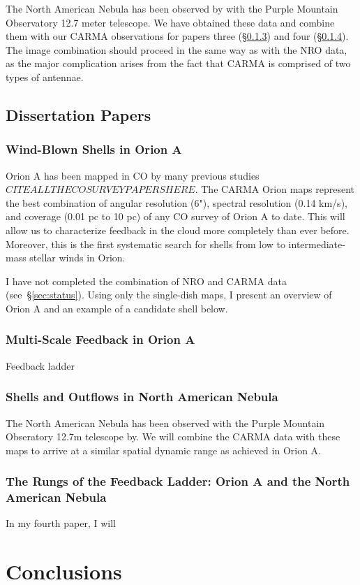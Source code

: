 The North American Nebula has been observed by \citet{Zhang14} with the Purple Mountain Observatory 12.7 meter telescope. We have obtained these data and combine them with our CARMA observations for papers three (\S\ref{sec:paper3}) and four (\S\ref{sec:paper4}). The image combination should proceed in the same way as with the NRO data, as the major complication arises from the fact that CARMA is comprised of two types of antennae.

    
    
    \subsection{Dissertation Papers}\label{sec:papers}
        \subsubsection{Wind-Blown Shells in Orion A}\label{sec:paper1}
Orion A has been mapped in CO by many previous studies$CITE ALL THE CO SURVEY PAPERS HERE$. The CARMA Orion maps represent the best combination of angular resolution (6"), spectral resolution (0.14 km/s), and coverage (0.01 pc to 10 pc) of any CO survey of Orion A to date. This will allow us to characterize feedback in the cloud more completely than ever before. Moreover, this is the first systematic search for shells from low to intermediate-mass stellar winds in Orion.
        
I have not completed the combination of NRO and CARMA data (see~\S\ref{sec:status}).  Using only the single-dish maps, I present an overview of Orion A and an example of a candidate shell below.
        
        \subsubsection{Multi-Scale Feedback in Orion A}\label{sec:paper2}
        Feedback ladder
        \subsubsection{Shells and Outflows in North American Nebula}\label{sec:paper3}
        The North American Nebula has been observed with the Purple Mountain Obseratory 12.7m telescope by. We will combine the CARMA data with these maps to arrive at a similar spatial dynamic range as achieved in Orion A.
        \subsubsection{The Rungs of the Feedback Ladder: Orion A and the North American Nebula}\label{sec:paper4}
        In my fourth paper, I will 
\section{Conclusions}\label{sec:conclusions}
    
    


  
  